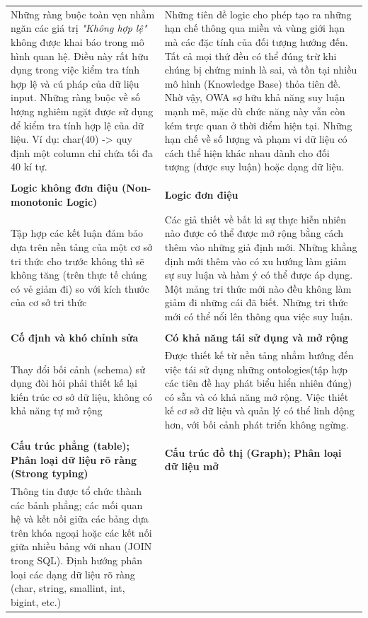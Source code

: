 \begin{longtable}{ p{7cm} p{7cm} }
\\
Những ràng buộc toàn vẹn nhằm ngăn các giá trị \textit{"Không hợp lệ"} không được khai báo trong mô hình quan hệ. Điều này rất hữu dụng trong việc kiểm tra tính hợp lệ và cú pháp của dữ liệu input. Những ràng buộc về số lượng nghiêm ngặt được sử dụng để kiểm tra tính hợp lệ của dữ liệu. Ví dụ: char(40) -> quy định một column chỉ chứa tối đa 40 kí tự.
&
Những tiên đề logic cho phép tạo ra những hạn chế thông qua miền và vùng giới hạn mà các đặc tính của đối tượng hướng đến. Tất cả mọi thứ đều có thể đúng trừ khi chúng bị chứng minh là sai, và tồn tại nhiều mô hình (Knowledge Base) thỏa tiên đề. Nhờ vậy, OWA sợ hữu khả năng suy luận mạnh mẽ, mặc dù chức năng này vẫn còn kém trực quan ở thời điểm hiện tại. Những hạn chế về số lượng và phạm vi dữ liệu có cách thể hiện khác nhau dành cho đối tượng (được suy luận) hoặc dạng dữ liệu.
\\
&
\\
\textbf{Logic không đơn điệu (Non-monotonic Logic)}
&
\textbf{Logic đơn điệu}
\\
Tập hợp các kết luận đảm bảo dựa trên nền tảng của một cơ sở tri thức cho trước không thì sẽ không tăng (trên thực tế chúng có vẻ giảm đi) so với kích thước của cơ sở tri thức 
&
Các giả thiết về bất kì sự thực hiễn nhiên nào được có thể được mở rộng bằng cách thêm vào những giả định mới. Những khẳng định mới thêm vào có xu hướng làm giảm sự suy luận và hàm ý có thể được áp dụng. Một mảng tri thức mới nào đều không làm giảm đi những cái đã biết. Những tri thức mới có thể nổi lên thông qua việc suy luận.
\\
&
\\
\textbf{Cố định và khó chỉnh sửa}
&
\textbf{Có khả năng tái sử dụng và mở rộng}
\\
Thay đổi bối cảnh (schema) sử dụng đòi hỏi phải thiết kế lại kiến trúc cơ sở dữ liệu, không có khả năng tự mở rộng& Được thiết kế từ nền tảng nhẳm hướng đến việc tái sử dụng những ontologies(tập hợp các tiên đề hay phát biểu hiển nhiên đúng) có sẵn và có khả năng mở rộng. Việc thiết kế cơ sở dữ liệu và quản lý có thể linh động hơn, với bối cảnh phát triển không ngừng.
\\
&
\\
\textbf{Cấu trúc phẳng (table); Phân loại dữ liệu rõ ràng (Strong typing) }
 &
\textbf{Cấu trúc đồ thị (Graph); Phân loại dữ liệu mở}
\\
Thông tin được tổ chức thành các bảnh phẳng; các mối quan hệ và kết nối giữa các bảng dựa trên khóa ngoại hoặc các kết nối giữa nhiều bảng với nhau (JOIN trong SQL). Định hướng phân loại các dạng dữ liệu rõ ràng (char, string, smallint, int, bigint, etc.)  
&


\end{longtable}
